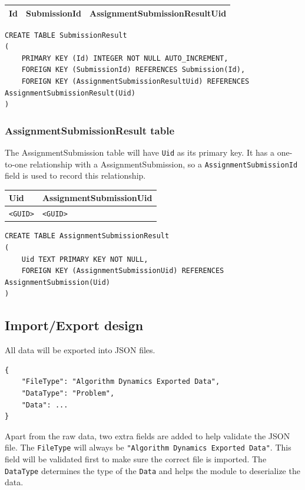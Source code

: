 \documentclass[a4paper]{report}
\begin{document}
\begin{tabulary}{\textwidth}{|L|L|L|}
    \hline
    Id & SubmissionId & AssignmentSubmissionResultUid \\
    \hline
\end{tabulary}

\begin{verbatim}
CREATE TABLE SubmissionResult
(
    PRIMARY KEY (Id) INTEGER NOT NULL AUTO_INCREMENT,
    FOREIGN KEY (SubmissionId) REFERENCES Submission(Id),
    FOREIGN KEY (AssignmentSubmissionResultUid) REFERENCES AssignmentSubmissionResult(Uid)
)
\end{verbatim}

\subsubsection{AssignmentSubmissionResult table}

The AssignmentSubmission table will have \texttt{Uid} as its primary key. It has a one-to-one relationship with a AssignmentSubmission, so a \texttt{AssignmentSubmissionId} field is used to record this relationship.

\begin{tabulary}{\textwidth}{|L|L|}
    \hline
    Uid & AssignmentSubmissionUid \\
    \hline
    \texttt{<GUID>} & \texttt{<GUID>} \\
    \hline
\end{tabulary}

\begin{verbatim}
CREATE TABLE AssignmentSubmissionResult
(
    Uid TEXT PRIMARY KEY NOT NULL,
    FOREIGN KEY (AssignmentSubmissionUid) REFERENCES AssignmentSubmission(Uid)
)
\end{verbatim}

\subsection{Import/Export design}

All data will be exported into JSON files.

\begin{verbatim}
{
    "FileType": "Algorithm Dynamics Exported Data",
    "DataType": "Problem",
    "Data": ...
}
\end{verbatim}

Apart from the raw data, two extra fields are added to help validate the JSON file. The \texttt{FileType} will always be \texttt{"Algorithm Dynamics Exported Data"}. This field will be validated first to make sure the correct file is imported. The \texttt{DataType} determines the type of the \texttt{Data} and helps the module to deserialize the data.
\end{document}
